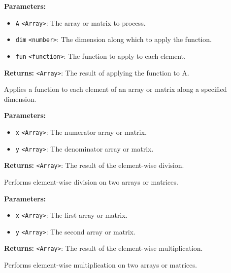 \documentclass[12pt,a4paper]{article}
\begin{document}
\noindent \textbf{Parameters:}
\begin{itemize}
  \item \texttt{A} \texttt{<Array>}: The array or matrix to process.
  \item \texttt{dim} \texttt{<number>}: The dimension along which to apply the function.
  \item \texttt{fun} \texttt{<function>}: The function to apply to each element.
\end{itemize}

\noindent \textbf{Returns:} \texttt{<Array>}: The result of applying the function to A.

\noindent Applies a function to each element of an array or matrix along a specified dimension.

\vspace{5mm}
\noindent {}


\noindent \textbf{Parameters:}
\begin{itemize}
  \item \texttt{x} \texttt{<Array>}: The numerator array or matrix.
  \item \texttt{y} \texttt{<Array>}: The denominator array or matrix.
\end{itemize}

\noindent \textbf{Returns:} \texttt{<Array>}: The result of the element-wise division.

\noindent Performs element-wise division on two arrays or matrices.

\vspace{5mm}
\noindent {}


\noindent \textbf{Parameters:}
\begin{itemize}
  \item \texttt{x} \texttt{<Array>}: The first array or matrix.
  \item \texttt{y} \texttt{<Array>}: The second array or matrix.
\end{itemize}

\noindent \textbf{Returns:} \texttt{<Array>}: The result of the element-wise multiplication.

\noindent Performs element-wise multiplication on two arrays or matrices.
\end{document}
